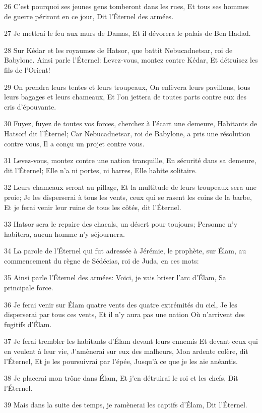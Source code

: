 \par 26 C'est pourquoi ses jeunes gens tomberont dans les rues, Et tous ses hommes de guerre périront en ce jour, Dit l'Éternel des armées.
\par 27 Je mettrai le feu aux murs de Damas, Et il dévorera le palais de Ben Hadad.
\par 28 Sur Kédar et les royaumes de Hatsor, que battit Nebucadnetsar, roi de Babylone. Ainsi parle l'Éternel: Levez-vous, montez contre Kédar, Et détruisez les fils de l'Orient!
\par 29 On prendra leurs tentes et leurs troupeaux, On enlèvera leurs pavillons, tous leurs bagages et leurs chameaux, Et l'on jettera de toutes parts contre eux des cris d'épouvante.
\par 30 Fuyez, fuyez de toutes vos forces, cherchez à l'écart une demeure, Habitants de Hatsor! dit l'Éternel; Car Nebucadnetsar, roi de Babylone, a pris une résolution contre vous, Il a conçu un projet contre vous.
\par 31 Levez-vous, montez contre une nation tranquille, En sécurité dans sa demeure, dit l'Éternel; Elle n'a ni portes, ni barres, Elle habite solitaire.
\par 32 Leurs chameaux seront au pillage, Et la multitude de leurs troupeaux sera une proie; Je les disperserai à tous les vents, ceux qui se rasent les coins de la barbe, Et je ferai venir leur ruine de tous les côtés, dit l'Éternel.
\par 33 Hatsor sera le repaire des chacals, un désert pour toujours; Personne n'y habitera, aucun homme n'y séjournera.
\par 34 La parole de l'Éternel qui fut adressée à Jérémie, le prophète, sur Élam, au commencement du règne de Sédécias, roi de Juda, en ces mots:
\par 35 Ainsi parle l'Éternel des armées: Voici, je vais briser l'arc d'Élam, Sa principale force.
\par 36 Je ferai venir sur Élam quatre vents des quatre extrémités du ciel, Je les disperserai par tous ces vents, Et il n'y aura pas une nation Où n'arrivent des fugitifs d'Élam.
\par 37 Je ferai trembler les habitants d'Élam devant leurs ennemis Et devant ceux qui en veulent à leur vie, J'amènerai sur eux des malheurs, Mon ardente colère, dit l'Éternel, Et je les poursuivrai par l'épée, Jusqu'à ce que je les aie anéantis.
\par 38 Je placerai mon trône dans Élam, Et j'en détruirai le roi et les chefs, Dit l'Éternel.
\par 39 Mais dans la suite des temps, je ramènerai les captifs d'Élam, Dit l'Éternel.

